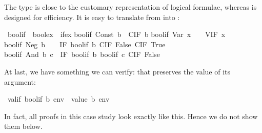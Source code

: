 \begin{isabellebody}
\begin{isamarkuptext}
The type  is close to the customary representation of logical
formulae, whereas  is designed for efficiency. It is easy to
translate from  into :%
\end{isamarkuptext}%
\isamarkuptrue%
\ bool{}if\ {\isacharcolon}{\isacharcolon}\ {\isachardoublequote}boolex\ {\isasymRightarrow}\ ifex{\isachardoublequote}\isanewline
\isamarkupfalse%
\isanewline
{\isachardoublequote}bool{}if\ {\isacharparenleft}Const\ b{\isacharparenright}\ {\isacharequal}\ CIF\ b{\isachardoublequote}\isanewline
{\isachardoublequote}bool{}if\ {\isacharparenleft}Var\ x{\isacharparenright}\ \ \ {\isacharequal}\ VIF\ x{\isachardoublequote}\isanewline
{\isachardoublequote}bool{}if\ {\isacharparenleft}Neg\ b{\isacharparenright}\ \ \ {\isacharequal}\ IF\ {\isacharparenleft}bool{}if\ b{\isacharparenright}\ {\isacharparenleft}CIF\ False{\isacharparenright}\ {\isacharparenleft}CIF\ True{\isacharparenright}{\isachardoublequote}\isanewline
{\isachardoublequote}bool{}if\ {\isacharparenleft}And\ b\ c{\isacharparenright}\ {\isacharequal}\ IF\ {\isacharparenleft}bool{}if\ b{\isacharparenright}\ {\isacharparenleft}bool{}if\ c{\isacharparenright}\ {\isacharparenleft}CIF\ False{\isacharparenright}{\isachardoublequote}\isamarkupfalse%
%
\begin{isamarkuptext}%
\noindent
At last, we have something we can verify: that  preserves the
value of its argument:%
\end{isamarkuptext}%
\isamarkuptrue%
\ {\isachardoublequote}valif\ {\isacharparenleft}bool{}if\ b{\isacharparenright}\ env\ {\isacharequal}\ value\ b\ env{\isachardoublequote}\isamarkupfalse%
\isamarkuptrue%
\isamarkupfalse%
\isamarkupfalse%
\isamarkupfalse%
%
\begin{isamarkuptext}%
\noindent
In fact, all proofs in this case study look exactly like this. Hence we do
not show them below.


\end{isamarkuptext}
\end{isabellebody}
